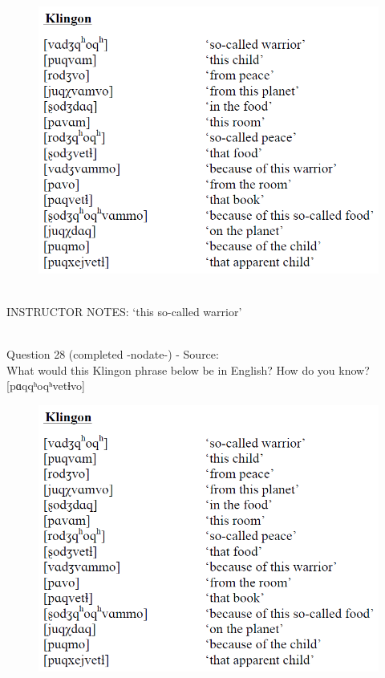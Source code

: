 \documentclass[12pt]{article}
\begin{document}
\begin{figure}[H]
\includegraphics{../images/klingon.png}
\end{figure}

~\\
INSTRUCTOR NOTES: ‘this so-called warrior’


~\\

{\large Question 28} (completed -nodate-) - Source: \\

What would this Klingon phrase below be in English? How do you know?\\

{[pɑqqʰoqʰvetɬvo]}

\begin{figure}[H]
\includegraphics{../images/klingon.png}
\end{figure}
\end{document}
